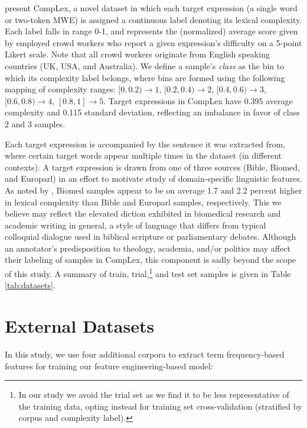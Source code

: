\documentclass{dcthesis}
\theoremstyle{definition}
\theoremstyle{remark}
\begin{document}
\citet{shardlow2020complex} present CompLex, a novel dataset in which each target expression (a single word or two-token MWE) is assigned a continuous label denoting its lexical complexity. Each label falls in range 0-1, and represents the (normalized) average score given by employed crowd workers who report a given expression's difficulty on a 5-point Likert scale. Note that all crowd workers originate from English speaking countries (UK, USA, and Australia). We define a sample's \textit{class} as the bin to which its complexity label belongs, where bins are formed using the following mapping of complexity ranges: $[0,0.2) \rightarrow 1$, $[0.2, 0.4) \rightarrow 2$, $[0.4, 0.6) \rightarrow 3$, $[0.6, 0.8) \rightarrow 4$, $[0.8, 1] \rightarrow 5$. Target expressions in CompLex have 0.395 average complexity and 0.115 standard deviation, reflecting an imbalance in favor of class 2 and 3 samples.

Each target expression is accompanied by the sentence it was extracted from, where certain target words appear multiple times in the dataset (in different contexts). A target expression is drawn from one of three sources (Bible, Biomed, and Europarl) in an effort to motivate study of domain-specific linguistic features. As noted by \citet{shardlow2020complex}, Biomed samples appear to be on average 1.7 and 2.2 percent higher in lexical complexity than Bible and Europarl samples, respectively. This we believe may reflect the elevated diction exhibited in biomedical research and academic writing in general, a style of language that differs from typical colloquial dialogue used in biblical scripture or parliamentary debates. Although an annotator's predisposition to theology, academia, and/or politics may affect their labeling of samples in CompLex, this component is sadly beyond the scope of this study. A summary of train, trial,\footnote{In our study we avoid the trial set as we find it to be less representative of the training data, opting instead for training set cross-validation (stratified by corpus and complexity label).} and test set samples is given in Table \ref{tab:datasets}.

\section{External Datasets}

In this study, we use four additional corpora to extract term frequency-based features for training our feature engineering-based model:
\end{document}
